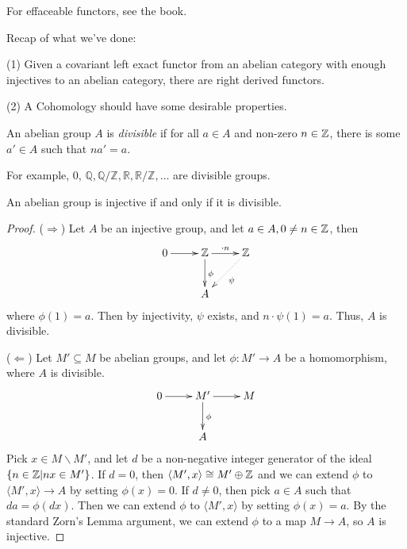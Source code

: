  \setcounter{lecture}{3}

\def\A{\mathcal{A}}

For effaceable functors, see the book.

Recap of what we've done:
\begin{list}{}{}
 \item[(1)] Given a covariant left exact functor from an abelian
category with enough injectives to an abelian category, there are
right derived functors.
 \item[(2)] A Cohomology should have some desirable properties.
\end{list}

\begin{definition}
An abelian group $A$ is \emph{divisible} if for all $a\in A$ and
non-zero $n\in \mathbb{Z}$, there is some $a'\in A$ such that $na'=a$.
\end{definition}
 For example, 0,
$\mathbb{Q},\mathbb{Q/Z}, \mathbb{R}, \mathbb{R/Z}, \dots$ are
divisible groups.

\begin{lemma} An abelian group is injective if and only if it is
divisible.
\end{lemma}
\begin{proof}
($\Rightarrow$) Let $A$ be an injective group, and let $a\in A,
0\not=n\in \mathbb{Z}$, then
\[\xymatrix{
    0 \ar[r] & \Z \ar[r]^{\cdot n} \ar[d]^{\phi} & \Z \ar@{.>}[dl]^{\psi} \\
    & A
}\]
 where $\phi(1)=a$.  Then by injectivity, $\psi$ exists, and
 $n\cdot \psi(1)=a$.  Thus, $A$ is divisible.

($\Leftarrow$) Let $M'\subseteq M$ be abelian groups, and let
$\phi:M'\to A$ be a homomorphism, where $A$ is divisible.
\[\xymatrix{
    0 \ar[r] & M' \ar[r] \ar[d]^{\phi} & M  \\
    & A
}\]
 Pick $x\in M\smallsetminus M'$, and let $d$ be a non-negative
 integer generator of the ideal $\{n\in \mathbb{Z}| nx\in M'\}$.  If
 $d=0$, then $\langle M',x \rangle \cong M'\oplus \mathbb{Z}$ and we can
 extend $\phi$ to $\langle M',x \rangle \to A$ by setting
 $\phi(x)=0$.  If $d\not=0$, then pick $a\in A$ such that
 $da=\phi(dx)$.  Then we can extend $\phi$ to $\langle M',x
 \rangle$ by setting $\phi(x)=a$.  By the standard Zorn's Lemma argument, we
 can extend $\phi$ to a map $M\to A$, so $A$ is injective.
\end{proof}


